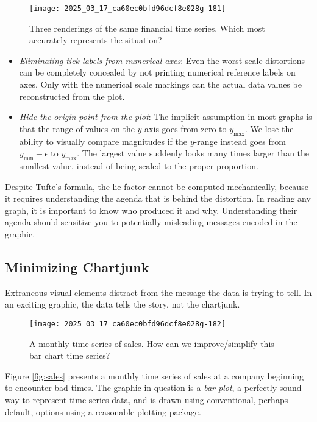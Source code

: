\documentclass[10pt]{article}
\begin{document}
\begin{figure}[h]
  \centering
  \texttt{[image: 2025\_03\_17\_ca60ec0bfd96dcf8e028g-181]}
  \caption{Three renderings of the same financial time series. Which most accurately represents the situation?}
  \label{fig:financial-time-series}
\end{figure}

\begin{itemize}
  \item \emph{Eliminating tick labels from numerical axes}: Even the worst scale distortions can be completely concealed by not printing numerical reference labels on axes. Only with the numerical scale markings can the actual data values be reconstructed from the plot.
  \item \emph{Hide the origin point from the plot}: The implicit assumption in most graphs is that the range of values on the $y$-axis goes from zero to $y_{\max}$. We lose the ability to visually compare magnitudes if the $y$-range instead goes from $y_{\min}-\epsilon$ to $y_{\max}$. The largest value suddenly looks many times larger than the smallest value, instead of being scaled to the proper proportion.
\end{itemize}

Despite Tufte's formula, the lie factor cannot be computed mechanically, because it requires understanding the agenda that is behind the distortion. In reading any graph, it is important to know who produced it and why. Understanding their agenda should sensitize you to potentially misleading messages encoded in the graphic.

\subsection{Minimizing Chartjunk}
Extraneous visual elements distract from the message the data is trying to tell. In an exciting graphic, the data tells the story, not the chartjunk.

\begin{figure}[h]
  \centering
  \texttt{[image: 2025\_03\_17\_ca60ec0bfd96dcf8e028g-182]}
  \caption{A monthly time series of sales. How can we improve/simplify this bar chart time series?}
\end{figure}

Figure \ref{fig:sales} presents a monthly time series of sales at a company beginning to encounter bad times. The graphic in question is a \emph{bar plot}, a perfectly sound way to represent time series data, and is drawn using conventional, perhaps default, options using a reasonable plotting package.
\end{document}
